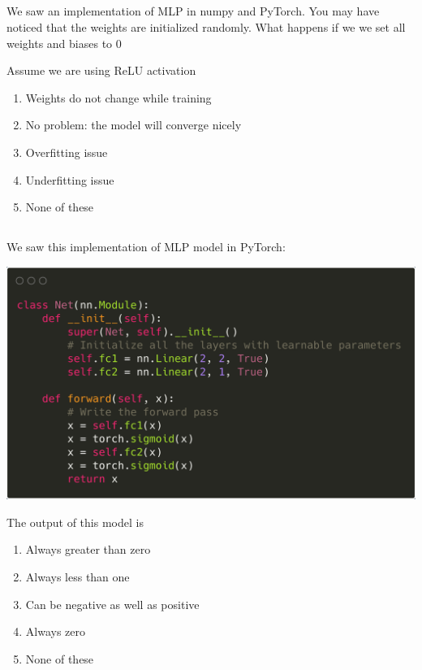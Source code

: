 \begin{frame}
\section{}
We saw an implementation of MLP in numpy and PyTorch. You may have noticed that the weights are initialized randomly. What happens if we we set all weights and biases to 0

Assume we are using ReLU activation

\begin{enumerate}[label=(\Alph*)]
\item Weights do not change while training    %
\item No problem: the model will converge nicely
\item Overfitting issue
\item Underfitting issue
\item None of these  %
\end{enumerate}
\end{frame}

\begin{frame}
\section{}
We saw this implementation of MLP model in PyTorch:

\includegraphics[scale=0.1]{images/q31_2.png}

The output of this model is
\begin{enumerate}[label=(\Alph*)]
\item Always greater than zero    %
\item Always less than one   %
\item Can be negative as well as positive
\item Always zero
\item None of these   %
\end{enumerate}
\end{frame}

